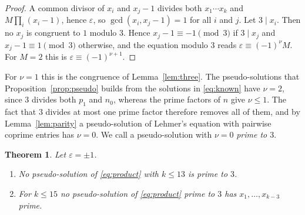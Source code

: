 \documentclass[11pt,reqno]{amsart}
\numberwithin{equation}{section}
\theoremstyle{plain}
\newtheorem{theorem}{Theorem}[section]
\theoremstyle{definition}
\theoremstyle{remark}
\begin{document}
\begin{proof}
A common divisor of $x_i$ and $x_j-1$ divides both $x_1\cdots x_k$ and
$M\prod_i(x_i-1)$, hence $\varepsilon$, so $\gcd(x_i,x_j-1)=1$ for all
$i$ and $j$. Let $3\mid x_i$. Then no $x_j$ is congruent to $1$ modulo
$3$. Hence $x_j-1\equiv-1\pmod3$ if $3\mid x_j$
and $x_j-1\equiv1\pmod3$ otherwise, and the equation modulo $3$ reads
$\varepsilon\equiv(-1)^{\nu}M$. For $M=2$ this is
$\varepsilon\equiv(-1)^{\nu+1}$.
\end{proof}

For $\nu=1$ this is the congruence of Lemma~\ref{lem:three}. The
pseudo-solutions that Proposition~\ref{prop:pseudo} builds from the
solutions in \eqref{eq:known} have $\nu=2$, since $3$ divides both
$p_1$ and $n_0$, whereas the prime factors of $n$ give
$\nu\le1$. The fact that $3$ divides at most one prime factor therefore
removes all of them, and by Lemma~\ref{lem:parity} a pseudo-solution
of Lehmer's equation with pairwise coprime entries has $\nu=0$. We call
a pseudo-solution with $\nu=0$ \emph{prime to $3$}.

\begin{theorem}\label{thm:pseudo3}
Let $\varepsilon=\pm1$.
\begin{enumerate}
\item[(i)] No pseudo-solution of \eqref{eq:product} with $k\le13$ is
prime to $3$.
\item[(ii)] For $k\le15$ no pseudo-solution of \eqref{eq:product} prime
to $3$ has $x_1,\dots,x_{k-3}$ prime.
\end{enumerate}
\end{theorem}
\end{document}
